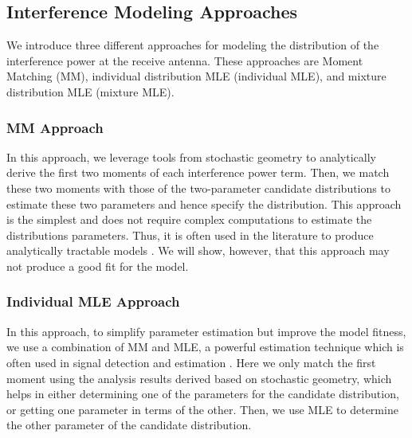 \documentclass[12pt, draftclsnofoot, onecolumn]{IEEEtran}
\theoremstyle{plain}
\begin{document}
\subsection{Interference Modeling Approaches} \label{RelativeEntropy}%
We introduce three different approaches for modeling the distribution of %
the interference power at the receive antenna. These approaches are {Moment Matching (MM)}, {\color{black}individual} distribution {MLE} (individual MLE), and mixture distribution MLE (mixture MLE). %

\subsubsection{MM Approach}
In this approach, we leverage tools from stochastic geometry to analytically derive the first two moments of each interference power term. Then, we match these two moments with those of the two-parameter candidate distributions to estimate these two parameters and hence specify the distribution. This approach is the simplest and does not require complex computations to estimate the distributions parameters.
{Thus, it is often used in the literature to produce analytically tractable models \cite{MM_6831093, heathHetero6515339,MM_6410048}. We will show, however, that this approach may not produce a good fit for the model.}
\subsubsection{Individual MLE Approach}
In this approach, to simplify parameter estimation but improve the model fitness, we use a combination of MM and MLE{, a powerful estimation technique which is often used in signal detection and estimation \cite{MLE_signal_poor2013introduction}}. Here we only match the first moment using the analysis results derived based on stochastic geometry, which helps in either determining one of the parameters for the candidate distribution, or getting one parameter in terms of the other. %
Then, we use MLE to determine the other parameter of the candidate distribution.
\end{document}
